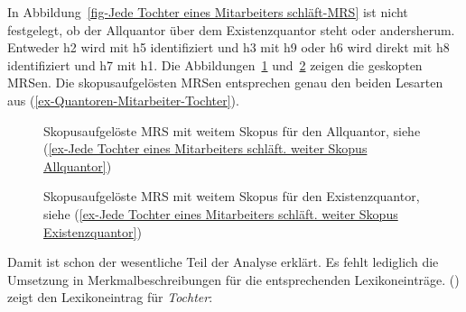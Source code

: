 In Abbildung~\ref{fig-Jede Tochter eines Mitarbeiters
  schläft-MRS} ist nicht festgelegt, ob der Allquantor über dem Existenzquantor steht oder
andersherum. Entweder h2 wird mit h5
identifiziert und h3 mit h9 oder h6 wird direkt mit h8 identifiziert und h7 mit h1. Die Abbildungen~\ref{fig-Jede-Tochter-eines-Mitarbeiters-schläft-Allquantor} und~\ref{fig-Jede-Tochter-eines-Mitarbeiters-schläft-Existenzquantor} zeigen die geskopten MRSen.
Die skopusaufgelösten MRSen entsprechen genau den beiden Lesarten aus
(\ref{ex-Quantoren-Mitarbeiter-Tochter}).
\begin{figure}
\caption{Skopusaufgelöste MRS mit weitem Skopus für den Allquantor, siehe (\ref{ex-Jede Tochter eines Mitarbeiters schläft. weiter Skopus Allquantor})}\label{fig-Jede-Tochter-eines-Mitarbeiters-schläft-Allquantor}
\end{figure}
\begin{figure}
\caption{Skopusaufgelöste MRS mit weitem Skopus für den Existenzquantor, siehe (\ref{ex-Jede Tochter eines Mitarbeiters schläft. weiter Skopus Existenzquantor})}\label{fig-Jede-Tochter-eines-Mitarbeiters-schläft-Existenzquantor}
\end{figure}


Damit ist schon der wesentliche Teil der Analyse erklärt. Es fehlt lediglich die Umsetzung
in Merkmalbeschreibungen für die entsprechenden Lexikoneinträge. 
() zeigt den Lexikoneintrag für \emph{Tochter}:

